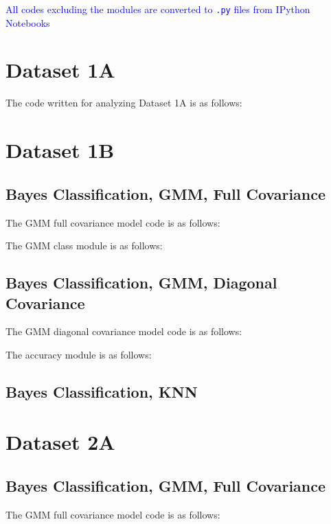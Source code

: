 \documentclass[11pt,a4paper]{article}
\newcommand{\noi}{\noindent}
\def\tt#1{\texttt{#1}}
\begin{document}
{\hypersetup{linkcolor=black}
 \tableofcontents}
\break

\noi
\textcolor{blue}{All codes excluding the modules are converted to \tt{.py} files from IPython Notebooks}
\section{Dataset 1A}
The code written for analyzing Dataset 1A is as follows:\vspace{-1em}


\section{Dataset 1B}
\subsection{Bayes Classification, GMM, Full Covariance}
The GMM full covariance model code is as follows: \vspace{-1em}


\noi
The GMM class module is as follows:\vspace{-1em}


\subsection{Bayes Classification, GMM, Diagonal Covariance}
The GMM diagonal covariance model code is as follows: \vspace{-1em}


\noi
The accuracy module is as follows:\vspace{-1em}


\subsection{Bayes Classification, KNN}


\section{Dataset 2A}
\subsection{Bayes Classification, GMM, Full Covariance}
The GMM full covariance model code is as follows: \vspace{-1em}

\end{document}
